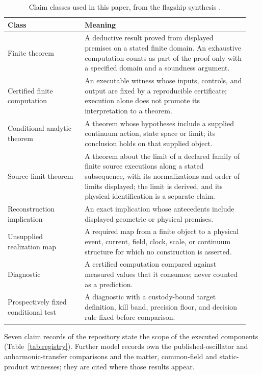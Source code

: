 \documentclass[11pt]{article}
\theoremstyle{definition}
\theoremstyle{remark}
\theoremstyle{plain}
\begin{document}
\begin{table}[htbp]
\centering
\small
\caption{Claim classes used in this paper, from the flagship synthesis \cite{flagship}.}
\label{tab:classes}
\begin{tabular}{@{}L{0.30\linewidth}L{0.64\linewidth}@{}}
\toprule
\textbf{Class} & \textbf{Meaning}\\
\midrule
Finite theorem & A deductive result proved from displayed premises
on a stated finite domain. An exhaustive computation counts as part of the
proof only with a specified domain and a soundness argument.\\
Certified finite computation & An executable witness whose inputs,
controls, and output are fixed by a reproducible certificate; execution alone
does not promote its interpretation to a theorem.\\
Conditional analytic theorem & A theorem whose hypotheses include a supplied continuum action, state space or limit; its conclusion holds on that supplied object.\\
Source limit theorem & A theorem about the limit of a declared family of
finite source executions along a stated subsequence, with its
normalizations and order of limits displayed; the limit is derived, and its
physical identification is a separate claim.\\
Reconstruction implication & An exact implication whose antecedents
include displayed geometric or physical premises.\\
Unsupplied realization map & A required map from a finite object to a
physical event, current, field, clock, scale, or continuum structure for which
no construction is asserted.\\
Diagnostic & A certified computation compared against measured
values that it consumes; never counted as a prediction.\\
Prospectively fixed conditional test & A diagnostic with a custody-bound
target definition, kill band, precision floor, and decision rule fixed
before comparison.\\
\bottomrule
\end{tabular}
\end{table}

Seven claim records of the repository \cite{ophrepo} state the scope of the
executed components (Table~\ref{tab:registry}). Further model records own
the published-oscillator and anharmonic-transfer comparisons and the matter,
common-field and static-product witnesses; they are cited where those
results appear.
\end{document}
